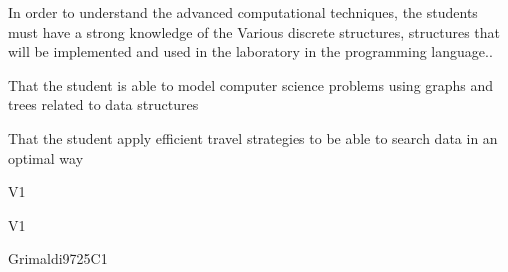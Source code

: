 \begin{syllabus}


\begin{justification}
In order to understand the advanced computational techniques, the students must have a strong knowledge of the
Various discrete structures, structures that will be implemented and used in the laboratory in the programming language..
\end{justification}

\begin{goals}
\item That the student is able to model computer science problems using graphs and trees related to data structures
\item That the student apply efficient travel strategies to be able to search data in an optimal way
\end{goals}

\begin{outcomes}{V1}
    \item {}
    \item {}	
    \item {}
\end{outcomes}

\begin{competences}{V1}
    \item {}
    \item {}
    \item {}
\end{competences}

\begin{unit}{\DSBasicsofCounting}{}{Grimaldi97}{25}{C1} 
    \begin{topics}
        \item \DSBasicsofCountingTopicCounting
	\item \DSBasicsofCountingTopicThePigeonhole
	\item \DSBasicsofCountingTopicPermutations
	\item \DSBasicsofCountingTopicSolving
	\item \DSBasicsofCountingTopicBasic
   \end{topics}
   \begin{learningoutcomes}
	\item \DSBasicsofCountingLOApplyCounting [\Familiarity]
	\item \DSBasicsofCountingLOApplyThe[\Familiarity]
	\item \DSBasicsofCountingLOComputePermutations[\Familiarity]
	\item \DSBasicsofCountingLOMap[\Familiarity]
	\item \DSBasicsofCountingLOSolveA[\Familiarity]
	\item \DSBasicsofCountingLOAnalyzeA[\Familiarity]
	\item \DSBasicsofCountingLOPerformComputations[\Familiarity]
   \end{learningoutcomes}
\end{unit}


\end{syllabus}
